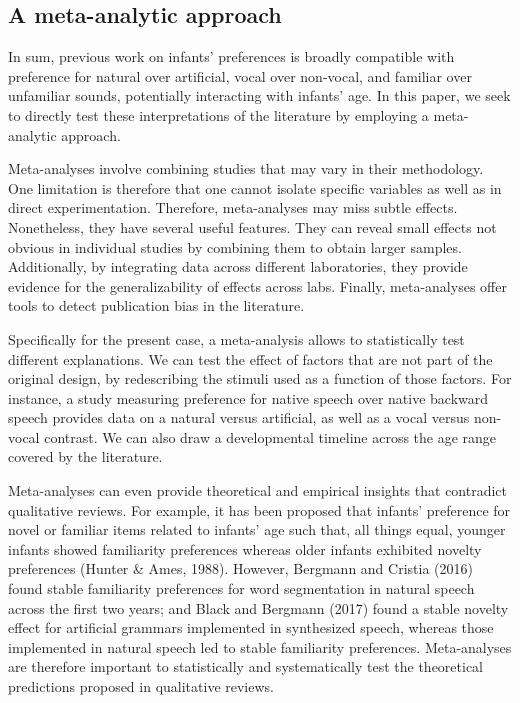 \documentclass[man]{apa6}
\begin{document}
\subsection{A meta-analytic approach}\label{a-meta-analytic-approach}

In sum, previous work on infants' preferences is broadly compatible with
preference for natural over artificial, vocal over non-vocal, and
familiar over unfamiliar sounds, potentially interacting with infants'
age. In this paper, we seek to directly test these interpretations of
the literature by employing a meta-analytic approach.

Meta-analyses involve combining studies that may vary in their
methodology. One limitation is therefore that one cannot isolate
specific variables as well as in direct experimentation. Therefore,
meta-analyses may miss subtle effects. Nonetheless, they have several
useful features. They can reveal small effects not obvious in individual
studies by combining them to obtain larger samples. Additionally, by
integrating data across different laboratories, they provide evidence
for the generalizability of effects across labs. Finally, meta-analyses
offer tools to detect publication bias in the literature.

Specifically for the present case, a meta-analysis allows to
statistically test different explanations. We can test the effect of
factors that are not part of the original design, by redescribing the
stimuli used as a function of those factors. For instance, a study
measuring preference for native speech over native backward speech
provides data on a natural versus artificial, as well as a vocal versus
non-vocal contrast. We can also draw a developmental timeline across the
age range covered by the literature.

Meta-analyses can even provide theoretical and empirical insights that
contradict qualitative reviews. For example, it has been proposed that
infants' preference for novel or familiar items related to infants' age
such that, all things equal, younger infants showed familiarity
preferences whereas older infants exhibited novelty preferences (Hunter
\& Ames, 1988). However, Bergmann and Cristia (2016) found stable
familiarity preferences for word segmentation in natural speech across
the first two years; and Black and Bergmann (2017) found a stable
novelty effect for artificial grammars implemented in synthesized
speech, whereas those implemented in natural speech led to stable
familiarity preferences. Meta-analyses are therefore important to
statistically and systematically test the theoretical predictions
proposed in qualitative reviews.
\end{document}

